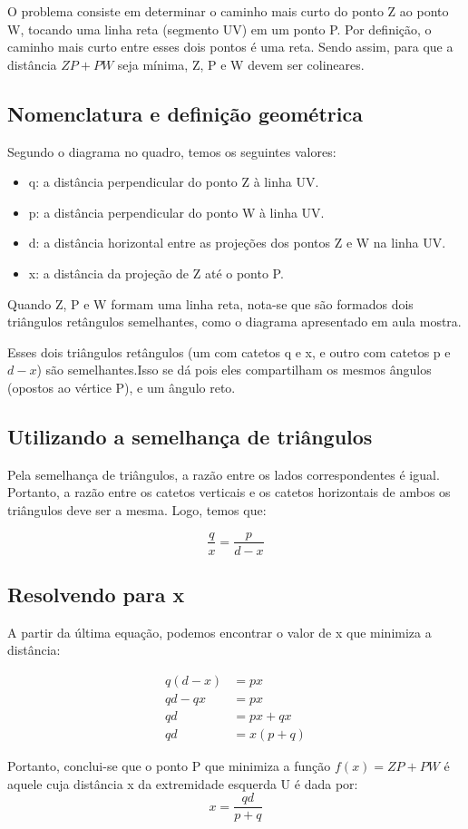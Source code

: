 O problema consiste em determinar o caminho mais
curto do ponto Z ao ponto W, tocando uma linha reta (segmento UV) em um ponto P.
Por definição, o caminho mais curto entre esses dois pontos é uma reta. Sendo assim, para que
a distância $ZP + PW$ seja mínima, Z, P e W devem ser colineares.

\subsection{Nomenclatura e definição geométrica}
Segundo o diagrama no quadro, temos os seguintes valores:

\begin{itemize}
    \item q: a distância perpendicular do ponto Z à linha UV.
    \item p: a distância perpendicular do ponto W à linha UV.
    \item d: a distância horizontal entre as projeções dos pontos Z e W na linha UV.
    \item x: a distância da projeção de Z até o ponto P.
\end{itemize}

Quando Z, P e W formam uma linha reta, nota-se que são formados dois triângulos retângulos
semelhantes, como o diagrama apresentado em aula mostra.

Esses dois triângulos retângulos (um com catetos q e x, e outro com catetos p e $d - x$)
são semelhantes.Isso se dá pois eles compartilham os mesmos ângulos (opostos ao vértice P),
e um ângulo reto.

\subsection{Utilizando a semelhança de triângulos}

Pela semelhança de triângulos, a razão entre os lados correspondentes é igual.
Portanto, a razão entre os catetos verticais e os catetos horizontais de ambos os
triângulos deve ser a mesma. Logo, temos que:

\[\frac{q}{x} = \frac{p}{d - x}\]

\subsection{Resolvendo para x}
A partir da última equação, podemos encontrar o valor de x que minimiza a distância:

\begin{align*}
    q(d - x) &= px \\
    qd - qx &= px \\
    qd &= px + qx \\
    qd &= x(p + q)
\end{align*}

Portanto, conclui-se que o ponto P que minimiza a função
$f(x) = ZP + PW$ é aquele cuja distância x da extremidade esquerda U é dada por:
\[x = \frac{qd}{p + q}\]
